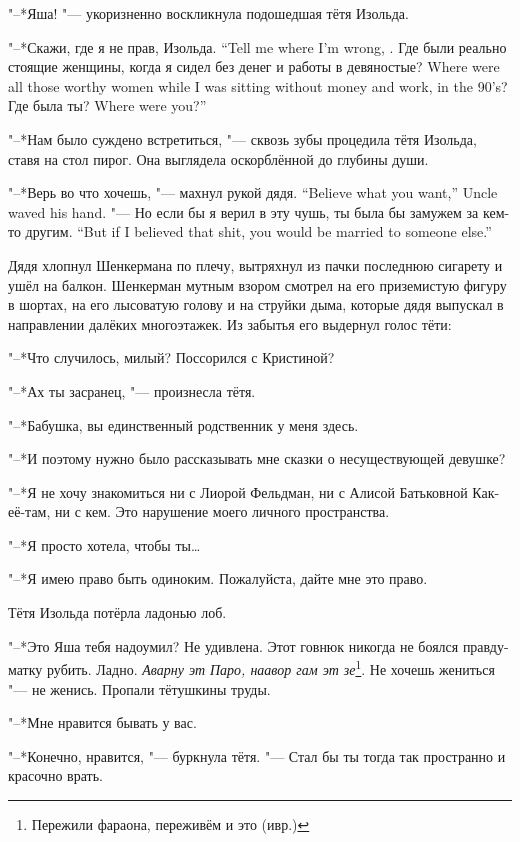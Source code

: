 "--*Яша! "--- укоризненно воскликнула подошедшая тётя Изольда.

{"--*Скажи, где я не прав, Изольда.}
{``Tell me where I'm wrong, \Izolda.}
{Где были реально стоящие женщины, когда я сидел без денег и работы в девяностые?}
{Where were all those worthy women while I was sitting without money and work, in the 90's?}
{Где была ты?}
{Where were you?''}

"--*Нам было суждено встретиться, "--- сквозь зубы процедила тётя Изольда, ставя на стол пирог.
Она выглядела оскорблённой до глубины души.

{"--*Верь во что хочешь, "--- махнул рукой дядя.}
{``Believe what you want,'' Uncle waved his hand.}
{"--- Но если бы я верил в эту чушь, ты была бы замужем за кем-то другим.}
{``But if I believed that shit, you would be married to someone else.''}

Дядя хлопнул Шенкермана по плечу, вытряхнул из пачки последнюю сигарету и ушёл на балкон.
Шенкерман мутным взором смотрел на его приземистую фигуру в шортах, на его лысоватую голову и на струйки дыма, которые дядя выпускал в направлении далёких многоэтажек.
Из забытья его выдернул голос тёти:

"--*Что случилось, милый?
Поссорился с Кристиной?

\asterism

"--*Ах ты засранец, "--- произнесла тётя.

"--*Бабушка, вы единственный родственник у меня здесь.

"--*И поэтому нужно было рассказывать мне сказки о несуществующей девушке?

"--*Я не хочу знакомиться ни с Лиорой Фельдман, ни с Алисой Батьковной Как-её-там, ни с кем.
Это нарушение моего личного пространства.

"--*Я просто хотела, чтобы ты\ldots{}

"--*Я имею право быть одиноким.
Пожалуйста, дайте мне это право.

Тётя Изольда потёрла ладонью лоб.

"--*Это Яша тебя надоумил?
Не удивлена.
Этот говнюк никогда не боялся правду-матку рубить.
Ладно.
\textit{Аварну эт Паро, наавор гам эт зе}\footnote{Пережили фараона, переживём и это (ивр.)}.
Не хочешь жениться "--- не женись.
Пропали тётушкины труды.

"--*Мне нравится бывать у вас.

"--*Конечно, нравится, "--- буркнула тётя.
"--- Стал бы ты тогда так пространно и красочно врать.

